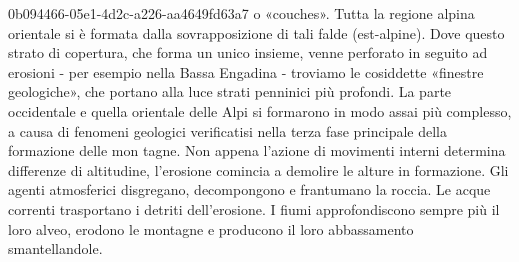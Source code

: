 \documentclass[preview]{standalone}
\begin{document}
\begin{snippet}{0b094466-05e1-4d2c-a226-aa4649fd63a7}
    o «couches». Tutta la regione alpina orientale si è formata dalla sovrapposizione di tali falde
    (est-alpine). Dove questo strato di copertura, che forma un unico insieme, venne perforato in
    seguito ad erosioni - per esempio nella Bassa Engadina - troviamo le cosiddette «finestre
    geologiche», che portano alla luce strati penninici più profondi.
    La parte occidentale e quella orientale delle Alpi si formarono in modo assai più complesso, a
    causa di fenomeni geologici verificatisi nella terza fase principale della formazione delle mon
    tagne. Non appena l'azione di movimenti interni determina differenze di altitudine, l'erosione
    comincia a demolire le alture in formazione. Gli agenti atmosferici disgregano, decompongono
    e frantumano la roccia. Le acque correnti trasportano i detriti dell'erosione. I fiumi
    approfondiscono sempre più il loro alveo, erodono le montagne e producono il loro
    abbassamento smantellandole.
\end{snippet}
\end{document}
